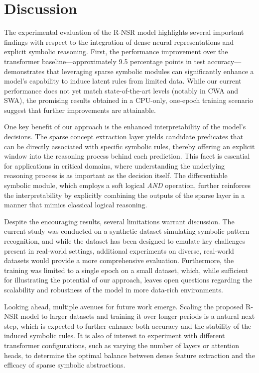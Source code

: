\documentclass{article}
\begin{document}
\section{Discussion}
The experimental evaluation of the R-NSR model highlights several important findings with respect to the integration of dense neural representations and explicit symbolic reasoning. First, the performance improvement over the transformer baseline—approximately 9.5 percentage points in test accuracy—demonstrates that leveraging sparse symbolic modules can significantly enhance a model's capability to induce latent rules from limited data. While our current performance does not yet match state-of-the-art levels (notably in CWA and SWA), the promising results obtained in a CPU-only, one-epoch training scenario suggest that further improvements are attainable.

One key benefit of our approach is the enhanced interpretability of the model's decisions. The sparse concept extraction layer yields candidate predicates that can be directly associated with specific symbolic rules, thereby offering an explicit window into the reasoning process behind each prediction. This facet is essential for applications in critical domains, where understanding the underlying reasoning process is as important as the decision itself. The differentiable symbolic module, which employs a soft logical \emph{AND} operation, further reinforces the interpretability by explicitly combining the outputs of the sparse layer in a manner that mimics classical logical reasoning.

Despite the encouraging results, several limitations warrant discussion. The current study was conducted on a synthetic dataset simulating symbolic pattern recognition, and while the dataset has been designed to emulate key challenges present in real-world settings, additional experiments on diverse, real-world datasets would provide a more comprehensive evaluation. Furthermore, the training was limited to a single epoch on a small dataset, which, while sufficient for illustrating the potential of our approach, leaves open questions regarding the scalability and robustness of the model in more data-rich environments.

Looking ahead, multiple avenues for future work emerge. Scaling the proposed R-NSR model to larger datasets and training it over longer periods is a natural next step, which is expected to further enhance both accuracy and the stability of the induced symbolic rules. It is also of interest to experiment with different transformer configurations, such as varying the number of layers or attention heads, to determine the optimal balance between dense feature extraction and the efficacy of sparse symbolic abstractions.
\end{document}
